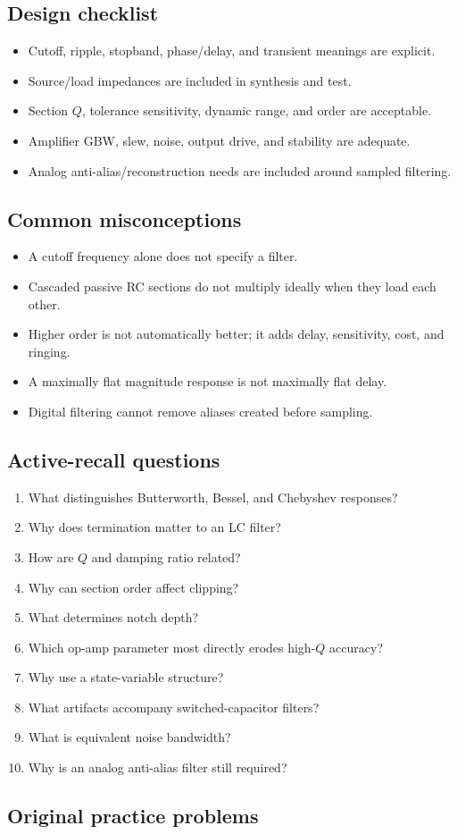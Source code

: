 \documentclass[10pt,letterpaper]{article}
\begin{document}
\subsection{Design checklist}
\begin{itemize}
  \item Cutoff, ripple, stopband, phase/delay, and transient meanings are explicit.
  \item Source/load impedances are included in synthesis and test.
  \item Section $Q$, tolerance sensitivity, dynamic range, and order are acceptable.
  \item Amplifier GBW, slew, noise, output drive, and stability are adequate.
  \item Analog anti-alias/reconstruction needs are included around sampled filtering.
\end{itemize}\subsection{Common misconceptions}
\begin{itemize}
  \item A cutoff frequency alone does not specify a filter.
  \item Cascaded passive RC sections do not multiply ideally when they load each other.
  \item Higher order is not automatically better; it adds delay, sensitivity, cost, and ringing.
  \item A maximally flat magnitude response is not maximally flat delay.
  \item Digital filtering cannot remove aliases created before sampling.
\end{itemize}\subsection{Active-recall questions}
\begin{enumerate}
  \item What distinguishes Butterworth, Bessel, and Chebyshev responses?
  \item Why does termination matter to an LC filter?
  \item How are $Q$ and damping ratio related?
  \item Why can section order affect clipping?
  \item What determines notch depth?
  \item Which op-amp parameter most directly erodes high-$Q$ accuracy?
  \item Why use a state-variable structure?
  \item What artifacts accompany switched-capacitor filters?
  \item What is equivalent noise bandwidth?
  \item Why is an analog anti-alias filter still required?
\end{enumerate}\subsection{Original practice problems}
\end{document}
